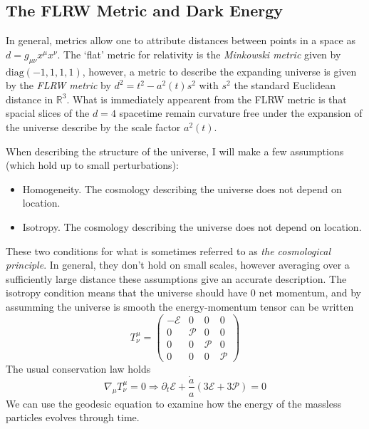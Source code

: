 \subsection{The FLRW Metric and Dark Energy}
In general, metrics allow one to attribute distances between points in a space as $d = g_{\mu\nu}x^\mu x^\nu$. 
The `flat' metric for relativity is the \textit{Minkowski metric} given by $\text{diag}(-1,1,1,1)$, however, a metric to describe the expanding universe is given by the \textit{FLRW metric} by $d^2 = t^2-a^2(t)s^2$ with $s^2$ the standard Euclidean distance in $\mathbb{R}^3$. 
What is immediately appearent from the FLRW metric is that spacial slices of the $d=4$ spacetime remain curvature free under the expansion of the universe describe by the scale factor $a^2(t)$.

When describing the structure of the universe, I will make a few assumptions (which hold up to small perturbations):
\begin{itemize}
    \item Homogeneity. The cosmology describing the universe does not depend on location.
    \item Isotropy. The cosmology describing the universe does not depend on location.
\end{itemize}
These two conditions for what is sometimes referred to as \textit{the cosmological principle}. In general, they don't hold on small scales, however averaging over a sufficiently large distance these assumptions give an accurate description. The isotropy condition means that the universe should have 0 net momentum, and by assumming the universe is smooth the energy-momentum tensor can be written
\begin{equation} T^\mu_\nu = \left(
\begin{array}{cccc}
    -\mathcal{E} & 0 & 0 & 0 \\
    0 & \mathcal{P} & 0 & 0 \\
    0 & 0 & \mathcal{P} & 0 \\
    0 & 0 & 0 & \mathcal{P}
\end{array}
\right)
\end{equation}
The usual conservation law holds
\begin{equation}
    \nabla_\mu T^{\mu}_{\nu} = 0 \Rightarrow \partial_t \mathcal{E} + \frac{\dot a}{a}(3\mathcal{E} + 3\mathcal{P}) = 0
\end{equation}
We can use the geodesic equation to examine how the energy of the massless particles evolves through time. 

